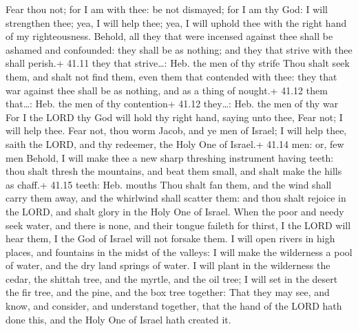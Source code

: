  Fear thou not; for I am with thee: be not dismayed; for
I am thy God: I will strengthen thee; yea, I will help thee; yea, I will
uphold thee with the right hand of my righteousness. 
Behold, all they that were incensed against thee shall be ashamed and
confounded: they shall be as nothing; and they that strive with thee
shall perish.+ 41.11 they that strive\ldots: Heb. the men of thy strife
 Thou shalt seek them, and shalt not find them, even them
that contended with thee: they that war against thee shall be as
nothing, and as a thing of nought.+ 41.12 them that\ldots: Heb. the men
of thy contention+ 41.12 they\ldots: Heb. the men of thy war
 For I the LORD thy God will hold thy right hand, saying
unto thee, Fear not; I will help thee.  Fear not, thou worm
Jacob, and ye men of Israel; I will help thee, saith the LORD, and thy
redeemer, the Holy One of Israel.+ 41.14 men: or, few men 
Behold, I will make thee a new sharp threshing instrument having teeth:
thou shalt thresh the mountains, and beat them small, and shalt make the
hills as chaff.+ 41.15 teeth: Heb. mouths  Thou shalt fan
them, and the wind shall carry them away, and the whirlwind shall
scatter them: and thou shalt rejoice in the LORD, and shalt glory in the
Holy One of Israel.  When the poor and needy seek water,
and there is none, and their tongue faileth for thirst, I the LORD will
hear them, I the God of Israel will not forsake them.  I
will open rivers in high places, and fountains in the midst of the
valleys: I will make the wilderness a pool of water, and the dry land
springs of water.  I will plant in the wilderness the
cedar, the shittah tree, and the myrtle, and the oil tree; I will set in
the desert the fir tree, and the pine, and the box tree together:
 That they may see, and know, and consider, and understand
together, that the hand of the LORD hath done this, and the Holy One of
Israel hath created it.

